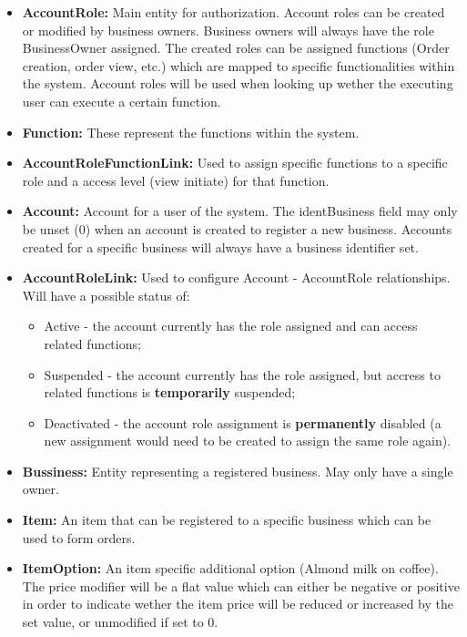 \documentclass[11pt,a4paper,pdftex]{article}
\begin{document}
\begin{itemize}
    \item \textbf{AccountRole:} Main entity for authorization. Account roles can be created or modified by business owners. Business owners will always have the role BusinessOwner assigned. The created roles can be assigned functions (Order creation, order view, etc.) which are mapped to specific functionalities within the system. Account roles will be used when looking up wether the executing user can execute a certain function.
    \item \textbf{Function:} These represent the functions within the system.
    \item \textbf{AccountRoleFunctionLink:} Used to assign specific functions to a specific role and a access level (view initiate) for that function.
    \item \textbf{Account:} Account for a user of the system. The identBusiness field may only be unset (0) when an account is created to register a new business. Accounts created for a specific business will always have a business identifier set.
    \item \textbf{AccountRoleLink:} Used to configure Account - AccountRole relationships. Will have a possible status of: 
    \begin{itemize}
        \item Active - the account currently has the role assigned and can access related functions;
        \item Suspended - the account currently has the role assigned, but accress to related functions is \textbf{temporarily} suspended;
        \item Deactivated - the account role assignment is \textbf{permanently} disabled (a new assignment would need to be created to assign the same role again).
    \end{itemize}
    \item \textbf{Bussiness:} Entity representing a registered business. May only have a single owner.
    \item \textbf{Item:} An item that can be registered to a specific business which can be used to form orders.
    \item \textbf{ItemOption:} An item specific additional option (Almond milk on coffee). The price modifier will be a flat value which can either be negative or positive in order to indicate wether the item price will be reduced or increased by the set value, or unmodified if set to 0.

\end{itemize}
\end{document}
